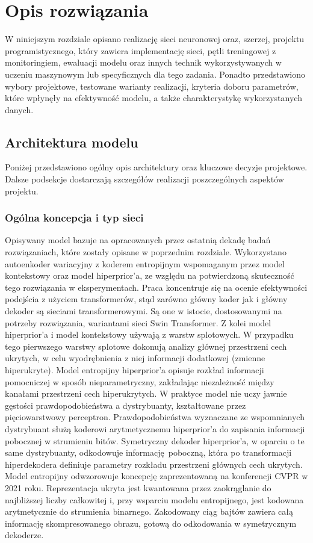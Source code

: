 \clearpage


\section{Opis rozwiązania}
W niniejszym rozdziale opisano realizację sieci neuronowej oraz, szerzej, projektu programistycznego, który zawiera implementację sieci, pętli treningowej z monitoringiem, ewaluacji modelu oraz innych technik wykorzystywanych w uczeniu maszynowym lub specyficznych dla tego zadania. Ponadto przedstawiono wybory projektowe, testowane warianty realizacji, kryteria doboru parametrów, które wpłynęły na efektywność modelu, a także charakterystykę wykorzystanych danych.

\subsection{Architektura modelu}
Poniżej przedstawiono ogólny opis architektury oraz kluczowe decyzje projektowe. Dalsze podsekcje dostarczają szczegółów realizacji poszczególnych aspektów projektu.

\subsubsection{Ogólna koncepcja i typ sieci}
Opisywany model bazuje na opracowanych przez ostatnią dekadę badań rozwiązaniach, które zostały opisane w poprzednim rozdziale. Wykorzystano autoenkoder wariacyjny z koderem entropijnym wspomaganym przez model kontekstowy oraz model hiperprior'a, ze względu na potwierdzoną skuteczność tego rozwiązania w eksperymentach. Praca koncentruje się na ocenie efektywności podejścia z użyciem transformerów, stąd zarówno główny koder jak i główny dekoder są sieciami transformerowymi. Są one w istocie, dostosowanymi na potrzeby rozwiązania, wariantami sieci Swin Transformer. Z kolei model hiperprior'a i model kontekstowy używają z warstw splotowych.
W przypadku tego pierwszego warstwy splotowe dokonują analizy głównej przestrzeni cech ukrytych, w celu wyodrębnienia z niej informacji dodatkowej (zmienne hiperukryte). Model entropijny hiperprior'a opisuje rozkład informacji pomocniczej w sposób nieparametryczny, zakładając niezależność między kanałami przestrzeni cech hiperukrytych. W praktyce model nie uczy jawnie gęstości prawdopodobieństwa a dystrybuanty, kształtowane przez pięciowarstwowy perceptron. Prawdopodobieństwa wyznaczane ze wspomnianych dystrybuant służą koderowi arytmetycznemu hiperprior'a do zapisania informacji pobocznej w strumieniu bitów. Symetryczny dekoder hiperprior'a, w oparciu o te same dystrybuanty, odkodowuje informację poboczną, która po transformacji hiperdekodera definiuje parametry rozkładu przestrzeni głównych cech ukrytych. Model entropijny odwzorowuje koncepcję zaprezentowaną na konferencji CVPR w 2021 roku\cite{he2021checkerboardcontextmodelefficient}. Reprezentacja ukryta jest kwantowana przez zaokrąglanie do najbliższej liczby całkowitej i, przy wsparciu modelu entropijnego, jest kodowana arytmetycznie do strumienia binarnego. Zakodowany ciąg bajtów zawiera całą informację skompresowanego obrazu, gotową do odkodowania w symetrycznym dekoderze.

